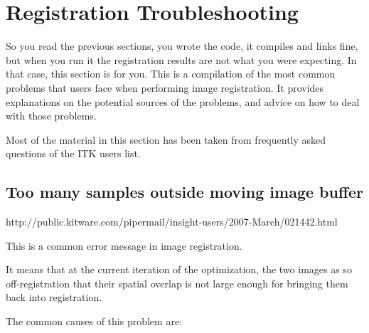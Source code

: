 \ifitkFullVersion

\fi



\section{Registration Troubleshooting}
So you read the previous sections, you wrote the code, it compiles and links fine,
but when you run it the registration results are not what you were expecting.
In that case, this section is for you. This is a compilation of the most common
problems that users face when performing image registration. It provides explanations
on the potential sources of the problems, and advice on how to deal with those problems.

Most of the material in this section has been taken from frequently asked questions of
the ITK users list.


\subsection{Too many samples outside moving image buffer}


http://public.kitware.com/pipermail/insight-users/2007-March/021442.html

This is a common error message in image registration.

It means that at the current iteration of the optimization,
the two images as so off-registration that their spatial
overlap is not large enough for bringing them back into
registration.

The common causes of this problem are:

